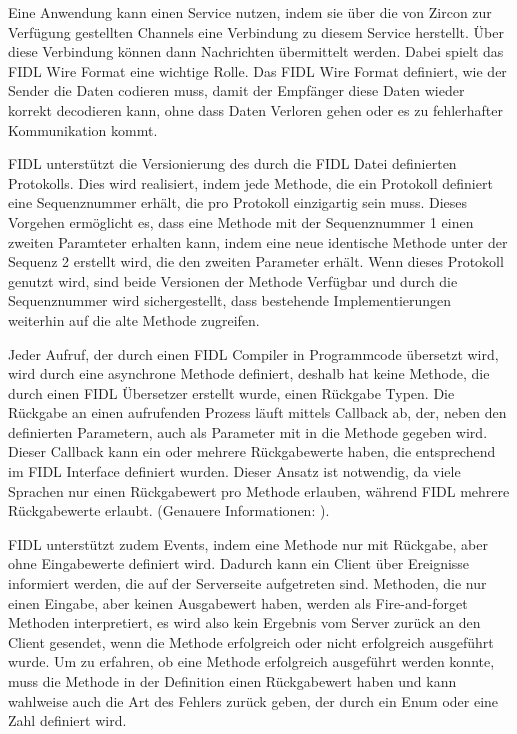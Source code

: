 \documentclass[a4paper]{scrartcl}
\begin{document}
Eine Anwendung kann einen Service nutzen, indem sie über die von Zircon zur Verfügung gestellten Channels eine Verbindung zu diesem Service herstellt. Über diese Verbindung können dann Nachrichten übermittelt werden. Dabei spielt das FIDL Wire Format eine wichtige Rolle. Das FIDL Wire Format definiert, wie der Sender die Daten codieren muss, damit der Empfänger diese Daten wieder korrekt decodieren kann, ohne dass Daten Verloren gehen oder es zu fehlerhafter Kommunikation kommt.

FIDL unterstützt die Versionierung des durch die FIDL Datei definierten Protokolls. Dies wird realisiert, indem jede Methode, die ein Protokoll definiert eine Sequenznummer erhält, die pro Protokoll einzigartig sein muss. Dieses Vorgehen ermöglicht es, dass eine Methode mit der Sequenznummer 1 einen zweiten Paramteter erhalten kann, indem eine neue identische Methode unter der Sequenz 2 erstellt wird, die den zweiten Parameter erhält. Wenn dieses Protokoll genutzt wird, sind beide Versionen der Methode Verfügbar und durch die Sequenznummer wird sichergestellt, dass bestehende Implementierungen weiterhin auf die alte Methode zugreifen. \cite{Fuchsia.FIDL.Tutorial}

Jeder Aufruf, der durch einen FIDL Compiler in Programmcode übersetzt wird, wird durch eine asynchrone Methode definiert, deshalb hat keine Methode, die durch einen FIDL Übersetzer erstellt wurde, einen Rückgabe Typen. Die Rückgabe an einen aufrufenden Prozess läuft mittels Callback ab, der, neben den definierten Parametern, auch als Parameter mit in die Methode gegeben wird. Dieser Callback kann ein oder mehrere Rückgabewerte haben, die entsprechend im FIDL Interface definiert wurden. Dieser Ansatz ist notwendig, da viele Sprachen nur einen Rückgabewert pro Methode erlauben, während FIDL mehrere Rückgabewerte erlaubt. (Genauere Informationen: \cite{Fuchsia.FIDL.Tutorial}).

FIDL unterstützt zudem Events, indem eine Methode nur mit Rückgabe, aber ohne Eingabewerte definiert wird. Dadurch kann ein Client über Ereignisse informiert werden, die auf der Serverseite aufgetreten sind. Methoden, die nur einen Eingabe, aber keinen Ausgabewert haben, werden als Fire-and-forget Methoden interpretiert, es wird also kein Ergebnis vom Server zurück an den Client gesendet, wenn die Methode erfolgreich oder nicht erfolgreich ausgeführt wurde. Um zu erfahren, ob eine Methode erfolgreich ausgeführt werden konnte, muss die Methode in der Definition einen Rückgabewert haben und kann wahlweise auch die Art des Fehlers zurück geben, der durch ein Enum oder eine Zahl definiert wird. \cite{Fuchsia.FIDL.Specitifcation}
\end{document}
